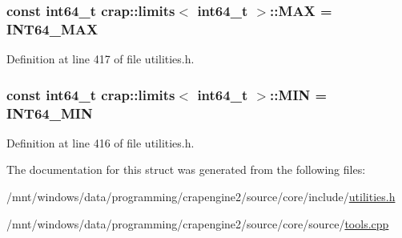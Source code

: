 \subsubsection[{M\+A\+X}]{\setlength{\rightskip}{0pt plus 5cm}const int64\+\_\+t {\bf crap\+::limits}$<$ int64\+\_\+t $>$\+::M\+A\+X = {\bf I\+N\+T64\+\_\+\+M\+A\+X}\hspace{0.3cm}{\ttfamily [static]}}\label{structcrap_1_1limits_3_01int64__t_01_4_a0465e299affe12a893a3d5faa6ecf0df}


Definition at line 417 of file utilities.\+h.

\hypertarget{structcrap_1_1limits_3_01int64__t_01_4_ae619cfb7ed151644a7bc145305ffa1dc}{}
\subsubsection[{M\+I\+N}]{\setlength{\rightskip}{0pt plus 5cm}const int64\+\_\+t {\bf crap\+::limits}$<$ int64\+\_\+t $>$\+::M\+I\+N = {\bf I\+N\+T64\+\_\+\+M\+I\+N}\hspace{0.3cm}{\ttfamily [static]}}\label{structcrap_1_1limits_3_01int64__t_01_4_ae619cfb7ed151644a7bc145305ffa1dc}


Definition at line 416 of file utilities.\+h.



The documentation for this struct was generated from the following files\+:\begin{DoxyCompactItemize}
\item 
/mnt/windows/data/programming/crapengine2/source/core/include/\hyperlink{utilities_8h}{utilities.\+h}\item 
/mnt/windows/data/programming/crapengine2/source/core/source/\hyperlink{tools_8cpp}{tools.\+cpp}\end{DoxyCompactItemize}
